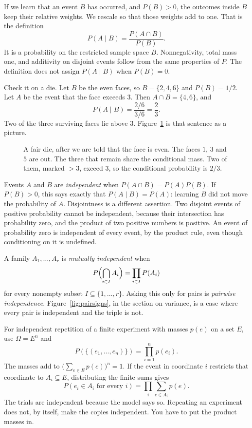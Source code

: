 If we learn that an event $B$ has occurred, and $P(B)>0$, the outcomes inside $B$ keep their relative weights. We rescale so that those weights add to one. That is the definition
\[
 P(A\mid B)=\frac{P(A\cap B)}{P(B)}.
\]
It is a probability on the restricted sample space $B$. Nonnegativity, total mass one, and additivity on disjoint events follow from the same properties of $P$. The definition does not assign $P(A\mid B)$ when $P(B)=0$.

Check it on a die. Let $B$ be the even faces, so $B=\{2,4,6\}$ and $P(B)=1/2$. Let $A$ be the event that the face exceeds $3$. Then $A\cap B=\{4,6\}$, and
\[
 P(A\mid B)=\frac{2/6}{3/6}=\frac23.
\]
Two of the three surviving faces lie above $3$. Figure~\ref{fig:even} is that sentence as a picture.

\begin{figure}[ht]
\centering
{}
\caption{A fair die, after we are told that the face is even. The faces $1$, $3$ and $5$ are out. The three that remain share the conditional mass. Two of them, marked $>3$, exceed $3$, so the conditional probability is $2/3$.}
\label{fig:even}
\end{figure}

Events $A$ and $B$ are \emph{independent} when $P(A\cap B)=P(A)P(B)$. If $P(B)>0$, this says exactly that $P(A\mid B)=P(A)$: learning $B$ did not move the probability of $A$. Disjointness is a different assertion. Two disjoint events of positive probability cannot be independent, because their intersection has probability zero, and the product of two positive numbers is positive. An event of probability zero is independent of every event, by the product rule, even though conditioning on it is undefined.

A family $A_1,\ldots,A_r$ is \emph{mutually independent} when
\[
 P\Bigl(\bigcap_{i\in I}A_i\Bigr)=\prod_{i\in I}P(A_i)
\]
for every nonempty subset $I\subseteq\{1,\ldots,r\}$. Asking this only for pairs is \emph{pairwise independence}. Figure~\ref{fig:pairsigns}, in the section on variance, is a case where every pair is independent and the triple is not.

For independent repetition of a finite experiment with masses $p(e)$ on a set $E$, use $\Omega=E^n$ and
\[
 P(\{(e_1,\ldots,e_n)\})=\prod_{i=1}^n p(e_i).
\]
The masses add to $\bigl(\sum_{e\in E}p(e)\bigr)^n=1$. If the event in coordinate $i$ restricts that coordinate to $A_i\subseteq E$, distributing the finite sums gives
\[
 P(e_i\in A_i\text{ for every }i)=\prod_i\sum_{e\in A_i}p(e).
\]
The trials are independent because the model says so. Repeating an experiment does not, by itself, make the copies independent. You have to put the product masses in.

